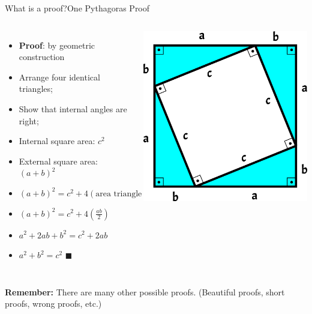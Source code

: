 \begin{frame}{What is a proof?}{One Pythagoras Proof}

  \begin{columns}[T]
      \begin{itemize}
        \item {\bf Proof}: by geometric construction
        \item Arrange four identical triangles;
        \item Show that internal angles are right;
        \item Internal square area: $c^2$
        \item External square area: $(a+b)^2$
        \item $(a+b)^2 = c^2 + 4(\text{area triangle})$
        \item $(a+b)^2 = c^2 + 4(\frac{ab}{2})$
        \item $a^2 + 2ab + b^2 = c^2 + 2ab$
        \item $a^2 + b^2 = c^2$ \hfill $\blacksquare$
      \end{itemize}
      \includegraphics[width=\textwidth]{../img/triangle_pytagoras}
  \end{columns}
  \bigskip

  {\bf Remember:} There are many other possible proofs. (Beautiful proofs, short proofs, wrong proofs, etc.)
\end{frame}

